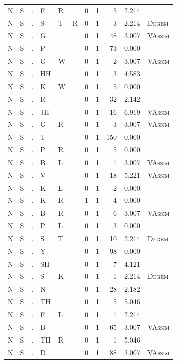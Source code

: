 \documentclass[12pt]{article}
\begin{document}
\begin{longtable}{r@{ } r@{ } c@{ } l@{ } l@{ } l@{ } r r r r l }
N & S & . & F & R &  & 0 & 1 & 5 & 2.214 &  \\
N & S & . & S & T & R & 0 & 1 & 3 & 2.214 & \textsc{Degem} \\
N & S & . & G &  &  & 0 & 1 & 48 & 3.007 & \textsc{VAssim} \\
N & S & . & P &  &  & 0 & 1 & 73 & 0.000 &  \\
N & S & . & G & W &  & 0 & 1 & 2 & 3.007 & \textsc{VAssim} \\
N & S & . & HH &  &  & 0 & 1 & 3 & 4.583 &  \\
N & S & . & K & W &  & 0 & 1 & 5 & 0.000 &  \\
N & S & . & R &  &  & 0 & 1 & 32 & 2.142 &  \\
N & S & . & JH &  &  & 0 & 1 & 16 & 6.919 & \textsc{VAssim} \\
N & S & . & G & R &  & 0 & 1 & 3 & 3.007 & \textsc{VAssim} \\
N & S & . & T &  &  & 0 & 1 & 150 & 0.000 &  \\
N & S & . & P & R &  & 0 & 1 & 5 & 0.000 &  \\
N & S & . & B & L &  & 0 & 1 & 1 & 3.007 & \textsc{VAssim} \\
N & S & . & V &  &  & 0 & 1 & 18 & 5.221 & \textsc{VAssim} \\
N & S & . & K & L &  & 0 & 1 & 2 & 0.000 &  \\
N & S & . & K & R &  & 1 & 1 & 4 & 0.000 &  \\
N & S & . & B & R &  & 0 & 1 & 6 & 3.007 & \textsc{VAssim} \\
N & S & . & P & L &  & 0 & 1 & 3 & 0.000 &  \\
N & S & . & S & T &  & 0 & 1 & 10 & 2.214 & \textsc{Degem} \\
N & S & . & Y &  &  & 0 & 1 & 98 & 0.000 &  \\
N & S & . & SH &  &  & 0 & 1 & 7 & 4.121 &  \\
N & S & . & S & K &  & 0 & 1 & 1 & 2.214 & \textsc{Degem} \\
N & S & . & N &  &  & 0 & 1 & 28 & 2.182 &  \\
N & S & . & TH &  &  & 0 & 1 & 5 & 5.046 &  \\
N & S & . & F & L &  & 0 & 1 & 1 & 2.214 &  \\
N & S & . & B &  &  & 0 & 1 & 65 & 3.007 & \textsc{VAssim} \\
N & S & . & TH & R &  & 0 & 1 & 1 & 5.046 &  \\
N & S & . & D &  &  & 0 & 1 & 88 & 3.007 & \textsc{VAssim} \\

\end{longtable}
\end{document}
